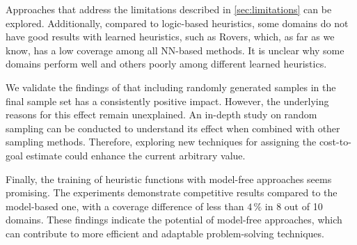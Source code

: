 Approaches that address the limitations described in \cref{sec:limitations} can be explored. Additionally, compared to logic-based heuristics, some domains do not have good results with learned heuristics, such as Rovers, which, as far as we know, has a low coverage among all NN-based methods. It is unclear why some domains perform well and others poorly among different learned heuristics.

We validate the findings of \citet{OToole/2022} that including randomly generated samples in the final sample set has a consistently positive impact. However, the underlying reasons for this effect remain unexplained. An in-depth study on random sampling can be conducted to understand its effect when combined with other sampling methods. Therefore, exploring new techniques for assigning the cost-to-goal estimate could enhance the current arbitrary value.

Finally, the training of heuristic functions with model-free approaches seems promising. The experiments demonstrate competitive results compared to the model-based one, with a coverage difference of less than $4\,\%$ in 8 out of 10 domains. These findings indicate the potential of model-free approaches, which can contribute to more efficient and adaptable problem-solving techniques.
